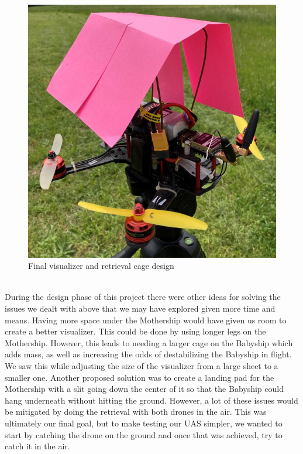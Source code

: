\documentclass[11pt]{article}
\begin{document}
\begin{figure}[htp]
    \centering
    \includegraphics[scale=0.3]{Babyship_Canopy.png}
    \caption{Final visualizer and retrieval cage design}
\end{figure}\\
During the design phase of this project there were other ideas for solving the issues we dealt with above that we may have explored given more time and means. Having more space under the Mothership would have given us room to create a better visualizer. This could be done by using longer legs on the Mothership. However, this leads to needing a larger cage on the Babyship which adds mass, as well as increasing the odds of destabilizing the Babyship in flight. We saw this while adjusting the size of the visualizer from a large sheet to a smaller one. Another proposed solution was to create a landing pad for the Mothership with a slit going down the center of it so that the Babyship could hang underneath without hitting the ground. However, a lot of these issues would be mitigated by doing the retrieval with both drones in the air. This was ultimately our final goal, but to make testing our UAS simpler, we wanted to start by catching the drone on the ground and once that was achieved, try to catch it in the air.
\end{document}
